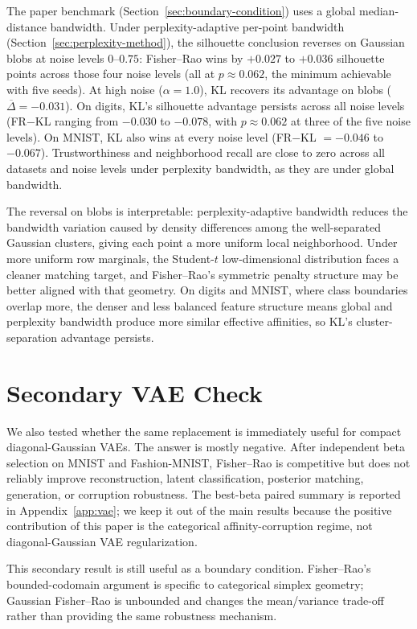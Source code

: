 \documentclass[11pt]{article}
\begin{document}
The paper benchmark (Section~\ref{sec:boundary-condition}) uses a global median-distance
bandwidth. Under perplexity-adaptive per-point bandwidth (Section~\ref{sec:perplexity-method}),
the silhouette conclusion reverses on Gaussian blobs at noise levels $0$--$0.75$: Fisher--Rao
wins by $+0.027$ to $+0.036$ silhouette points across those four noise levels (all at
$p \approx 0.062$, the minimum achievable with five seeds). At high noise ($\alpha=1.0$), KL
recovers its advantage on blobs ($\overline{\Delta}=-0.031$). On digits, KL's silhouette
advantage persists across all noise levels (FR$-$KL ranging from $-0.030$ to $-0.078$,
with $p \approx 0.062$ at three of the five noise levels). On MNIST, KL also wins at every
noise level (FR$-$KL $= -0.046$ to $-0.067$). Trustworthiness and neighborhood recall are
close to zero across all datasets and noise levels under perplexity bandwidth, as they are
under global bandwidth.

The reversal on blobs is interpretable: perplexity-adaptive bandwidth reduces the bandwidth
variation caused by density differences among the well-separated Gaussian clusters, giving
each point a more uniform local neighborhood. Under more uniform row marginals, the
Student-$t$ low-dimensional distribution faces a cleaner matching target, and Fisher--Rao's
symmetric penalty structure may be better aligned with that geometry. On digits and MNIST,
where class boundaries overlap more, the denser and less balanced feature structure means
global and perplexity bandwidth produce more similar effective affinities, so KL's cluster-
separation advantage persists.

\section{Secondary VAE Check}
\label{sec:vae-results}

We also tested whether the same replacement is immediately useful for compact diagonal-Gaussian
VAEs. The answer is mostly negative. After independent beta selection on MNIST and
Fashion-MNIST, Fisher--Rao is competitive but does not reliably improve reconstruction, latent
classification, posterior matching, generation, or corruption robustness. The best-beta paired
summary is reported in Appendix~\ref{app:vae}; we keep it out of the main results because the
positive contribution of this paper is the categorical affinity-corruption regime, not
diagonal-Gaussian VAE regularization.

This secondary result is still useful as a boundary condition. Fisher--Rao's bounded-codomain
argument is specific to categorical simplex geometry; Gaussian Fisher--Rao is unbounded and
changes the mean/variance trade-off rather than providing the same robustness mechanism.
\end{document}
